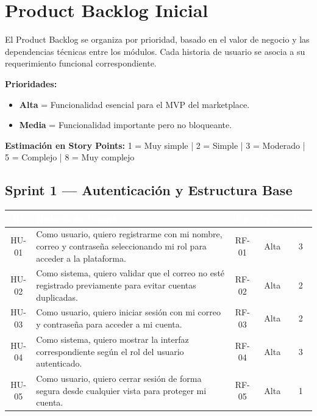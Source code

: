 \documentclass[12pt,a4paper]{article}
\begin{document}
\section{Product Backlog Inicial}

El Product Backlog se organiza por prioridad, basado en el valor de negocio y las dependencias técnicas entre los módulos. Cada historia de usuario se asocia a su requerimiento funcional correspondiente.

\textbf{Prioridades:}
\begin{itemize}[nosep]
    \item \textbf{Alta} = Funcionalidad esencial para el MVP del marketplace.
    \item \textbf{Media} = Funcionalidad importante pero no bloqueante.
\end{itemize}

\textbf{Estimación en Story Points:} 1 = Muy simple | 2 = Simple | 3 = Moderado | 5 = Complejo | 8 = Muy complejo

\subsection{Sprint 1 --- Autenticación y Estructura Base}
\begin{longtable}{|c|p{8cm}|c|c|c|}
\hline
\rowcolor{darkbg}\textcolor{white}{\textbf{ID}} & \textcolor{white}{\textbf{Historia de Usuario}} & \textcolor{white}{\textbf{RF}} & \textcolor{white}{\textbf{Prior.}} & \textcolor{white}{\textbf{Pts}} \\
\hline
HU-01 & Como usuario, quiero registrarme con mi nombre, correo y contraseña seleccionando mi rol para acceder a la plataforma. & RF-01 & Alta & 3 \\
\hline
HU-02 & Como sistema, quiero validar que el correo no esté registrado previamente para evitar cuentas duplicadas. & RF-02 & Alta & 2 \\
\hline
HU-03 & Como usuario, quiero iniciar sesión con mi correo y contraseña para acceder a mi cuenta. & RF-03 & Alta & 2 \\
\hline
HU-04 & Como sistema, quiero mostrar la interfaz correspondiente según el rol del usuario autenticado. & RF-04 & Alta & 3 \\
\hline
HU-05 & Como usuario, quiero cerrar sesión de forma segura desde cualquier vista para proteger mi cuenta. & RF-05 & Alta & 1 \\
\hline
\end{longtable}
\end{document}
